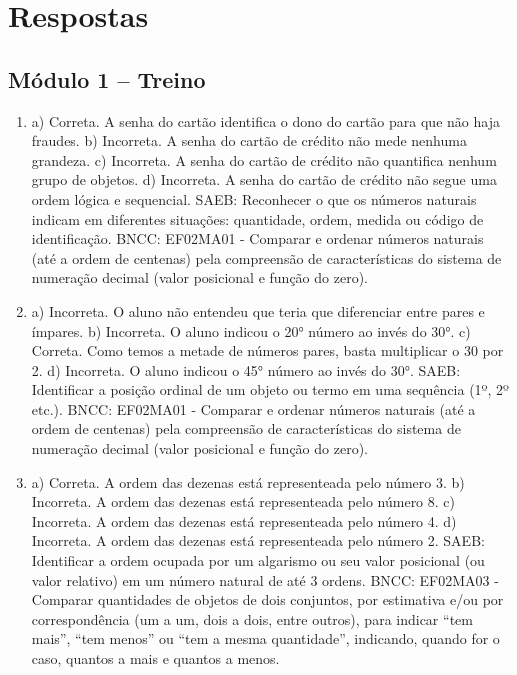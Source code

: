 \chapter{Respostas}
\pagestyle{plain}
\footnotesize

\pagecolor{gray!40}

\section*{Módulo 1 – Treino}

\begin{enumerate}
\item
a) Correta. A senha do cartão identifica o dono do cartão para que não haja fraudes.
b) Incorreta. A senha do cartão de crédito não mede nenhuma grandeza.
c) Incorreta. A senha do cartão de crédito não quantifica nenhum grupo de objetos.
d) Incorreta. A senha do cartão de crédito não segue uma ordem lógica e sequencial.
SAEB: Reconhecer o que os números naturais indicam em diferentes
situações: quantidade, ordem, medida ou código de identificação.
BNCC: EF02MA01 - Comparar e ordenar números naturais (até a ordem de
centenas) pela compreensão de características do sistema de numeração decimal (valor
posicional e função do zero).

\item
a) Incorreta. O aluno não entendeu que teria que diferenciar entre pares e ímpares.
b) Incorreta. O aluno indicou o 20° número ao invés do 30°.
c) Correta. Como temos a metade de números pares, basta multiplicar o 30 por 2.
d) Incorreta. O aluno indicou o 45° número ao invés do 30°.
SAEB: Identificar a posição ordinal de um objeto ou termo em uma sequência (1º, 2º etc.).
BNCC: EF02MA01 - Comparar e ordenar números naturais (até a ordem de centenas) pela compreensão de características do sistema de numeração decimal (valor
posicional e função do zero).

\item
a) Correta. A ordem das dezenas está representeada pelo número 3.
b) Incorreta. A ordem das dezenas está representeada pelo número 8.
c) Incorreta. A ordem das dezenas está representeada pelo número 4.
d) Incorreta. A ordem das dezenas está representeada pelo número 2.
SAEB: Identificar a ordem ocupada por um algarismo ou seu valor posicional (ou valor relativo) em um número natural de até 3 ordens. BNCC: EF02MA03 - Comparar quantidades de objetos de dois conjuntos, por estimativa e/ou por correspondência (um a um, dois a dois, entre outros), para indicar ``tem mais'', ``tem menos'' ou ``tem a mesma quantidade'', indicando, quando for o caso, quantos a mais e quantos a menos.
\end{enumerate}

